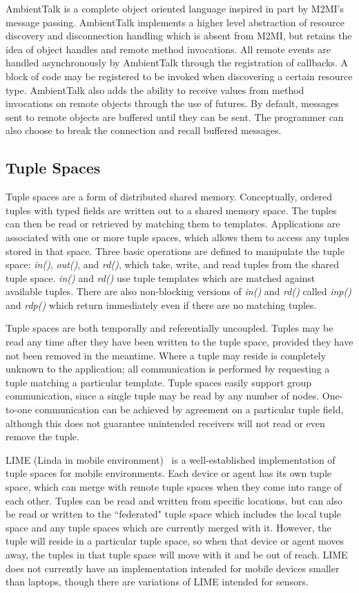 AmbientTalk\cite{ambienttalk} is a complete object oriented language inspired in part by M2MI's message passing. AmbientTalk implements a higher level abstraction of resource discovery and disconnection handling which is absent from M2MI, but retains the idea of object handles and remote method invocations. All remote events are handled asynchronously by AmbientTalk through the registration of callbacks. A block of code may be registered to be invoked when discovering a certain resource type. AmbientTalk also adds the ability to receive values from method invocations on remote objects through the use of futures. By default, messages sent to remote objects are buffered until they can be sent. The programmer can also choose to break the connection and recall buffered messages.

\subsection{Tuple Spaces}

Tuple spaces are a form of distributed shared memory. Conceptually, ordered tuples with typed fields are written out to a shared memory space. The tuples can then be read or retrieved by matching them to templates. Applications are associated with one or more tuple spaces, which allows them to access any tuples stored in that space. Three basic operations are defined to manipulate the tuple space: \textit{in()}, \textit{out()}, and \textit{rd()}, which take, write, and read tuples from the shared tuple space. \textit{in()} and \textit{rd()} use tuple templates which are matched against available tuples. There are also non-blocking versions of \textit{in()} and \textit{rd()} called \textit{inp()} and \textit{rdp()} which return immediately even if there are no matching tuples.

Tuple spaces are both temporally and referentially uncoupled. Tuples may be read any time after they have been written to the tuple space, provided they have not been removed in the meantime. Where a tuple may reside is completely unknown to the application; all communication is performed by requesting a tuple matching a particular template. Tuple spaces easily support group communication, since a single tuple may be read by any number of nodes. One-to-one communication can be achieved by agreement on a particular tuple field, although this does not guarantee unintended receivers will not read or even remove the tuple.

LIME (Linda in mobile environment)~\cite{lime} is a well-established implementation of tuple spaces\cite{linda} for mobile environments. Each device or agent has its own tuple space, which can merge with remote tuple spaces when they come into range of each other. Tuples can be read and written from specific locations, but can also be read or written to the ``federated" tuple space which includes the local tuple space and any tuple spaces which are currently merged with it. However, the tuple will reside in a particular tuple space, so when that device or agent moves away, the tuples in that tuple space will move with it and be out of reach. LIME does not currently have an implementation intended for mobile devices smaller than laptops, though there are variations of LIME intended for sensors.

